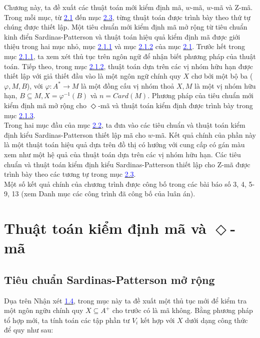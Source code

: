 \begin{flushleft}
Chương này, ta đề xuất các thuật toán mới kiểm định mã, $w$-mã, $w$-mã và Z-mã. Trong mỗi mục, từ \hyperlink{42}{\textcolor{blue}{2.1}} đến mục \hyperlink{page.52}{\textcolor{blue}{2.3}}, từng thuật toán được trình bày theo thứ tự chúng được thiết lập. Một tiêu chuẩn mới kiểm định mã mở rộng từ tiêu chuẩn kinh điển Sardinas-Patterson và thuật toán hiệu quả kiểm định mã được giới thiệu trong hai mục nhỏ, mục \hyperlink{page.42}{\textcolor{blue}{2.1.1}} và mục \hyperlink{page.32}{\textcolor{blue}{2.1.2}} của mục \hyperlink{page.42}{\textcolor{blue}{2.1}}. Trước hết trong mục \hyperlink{page.42}{\textcolor{blue}{2.1.1}}, ta xem xét thủ tục trên ngôn ngữ để nhận biết phương pháp của thuật toán. Tiếp theo, trong mục \hyperlink{page.42}{\textcolor{blue}{2.1.2}}, thuật toán dựa trên các vị nhóm hữu hạn được thiết lập với giả thiết đầu vào là một ngôn ngữ chính quy $X$ chơ bởi một bộ ba ($\varphi, M, B$), với $\varphi : A^* \to M$ là một đồng cấu vị nhóm thoả $X, M$ là một vị nhóm hữu hạn, $B \subseteq M, X = \varphi^{-1} (B)$ và $n = Card(M)$. Phương pháp của tiêu chuẩn mới kiểm định mã mở rộng cho $\Diamond$-mã và thuật toán kiểm định được trình bày trong mục \hyperlink{page.44}{\textcolor{blue}{2.1.3}}. \\
\hspace{10mm}Trong hai mục đầu của mục \hyperlink{page.46}{\textcolor{blue}{2.2}}, ta đưa vào các tiêu chuẩn và thuật toán kiểm định kiểu Sardinas-Patterson thiết lập mã cho $w$-mã. Kết quả chính của phần này là một thuật toán hiệu quả dựa trên đồ thị có hướng với cung cấp có gán màu xem như một hệ quả của thuật toán dựa trên các vị nhóm hữu hạn. Các tiêu chuẩn và thuật toán kiểm định kiểu Sardinas-Patterson thiết lập cho Z-mã được trình bày theo các tương tự trong mục \hyperlink{page.52}{\textcolor{blue}{2.3}}.\\
\hspace{10mm}Một số kết quả chính của chương trình được công bố trong các bài báo số 3, 4, 5-9, 13 (xem Danh mục các công trình đã công bố của luân án).\\
\section{Thuật toán kiểm định mã và $\Diamond$-mã}
\subsection{Tiêu chuẩn Sardinas-Patterson mở rộng}
Dụa trên Nhận xét \hyperlink{page.18}{\textcolor{blue}{1.4}}, trong mục này ta đề xuất một thủ tục mới để kiểm tra một ngôn ngữu chính quy $X \subseteq A^+$ cho trước có là mã không. Bằng phương pháp tổ hợp mới, ta tính toán các tập phần tư $V_i$ kết hợp với $X$ dưới dạng công thức để quy như sau:
\end{flushleft}
